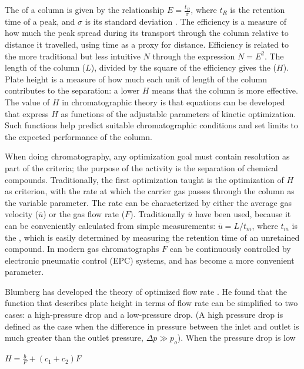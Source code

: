 The  of a column is given by the relationship \(E =
\frac{t_R}{\sigma} \), where \(t_R\) is the retention time of a peak, and
\(\sigma\) is its standard deviation \autocite{Blumberg2018}. The efficiency is
a measure of how much the peak spread during its transport through the column
relative to distance it travelled, using time as a proxy for distance.
Efficiency is related to the more traditional but less intuitive  \(N\) through the expression \(N = E^2\). The length of the column
(\(L\)), divided by the square of the efficiency gives the  (\(H\)). Plate height is a measure of how much each unit of length of
the column contributes to the separation: a lower \(H\) means that the column is
more effective. The value of \(H\) in chromatographic theory is that equations
can be developed that express \(H\) as functions of the adjustable parameters of
kinetic optimization. Such functions help predict suitable chromatographic
conditions and set limits to the expected performance of the column.

When doing chromatography, any optimization goal must contain resolution as part
of the criteria; the purpose of the activity is the separation of chemical
compounds. Traditionally, the first optimization taught is the optimization of
\(H\) as criterion, with the rate at which the carrier gas passes through the
column as the variable parameter. The rate can be characterized by either the
average gas velocity (\(\overline{u}\)) or the gas flow rate (\(F\)).
Traditionally \(\overline{u}\) have been used, because it can be conveniently
calculated from simple measurements: \(\overline{u} = L/t_m\), where \(t_m\) is
the , which is easily determined by measuring the
retention time of an unretained compound. In modern gas chromatographs \(F\) can
be continuously controlled by electronic pneumatic control (EPC) systems, and
has become a more convenient parameter.

Blumberg has developed the theory of optimized flow rate
\autocite{Blumberg1999}. He found that the function that describes plate height
in terms of flow rate can be simplified to two cases: a high-pressure drop and a
low-pressure drop. (A high pressure drop is defined as the case when the
difference in pressure between the inlet and outlet is much greater than the
outlet pressure, \(\Delta{p} \gg p_o\)). When the pressure drop is low 

\(H = \frac{\displaystyle b}{\displaystyle F}+(c_1+c_2)F \)

